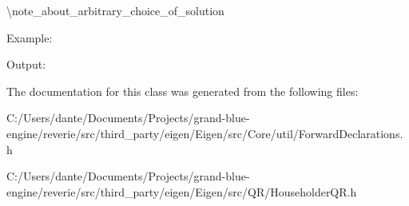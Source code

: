 \textbackslash{}note\+\_\+about\+\_\+arbitrary\+\_\+choice\+\_\+of\+\_\+solution

Example\+: 
\begin{DoxyCodeInclude}{0}
\end{DoxyCodeInclude}
 Output\+: 
\begin{DoxyVerbInclude}
\end{DoxyVerbInclude}
 

The documentation for this class was generated from the following files\+:\begin{DoxyCompactItemize}
\item 
C\+:/\+Users/dante/\+Documents/\+Projects/grand-\/blue-\/engine/reverie/src/third\+\_\+party/eigen/\+Eigen/src/\+Core/util/Forward\+Declarations.\+h\item 
C\+:/\+Users/dante/\+Documents/\+Projects/grand-\/blue-\/engine/reverie/src/third\+\_\+party/eigen/\+Eigen/src/\+Q\+R/Householder\+Q\+R.\+h\end{DoxyCompactItemize}

